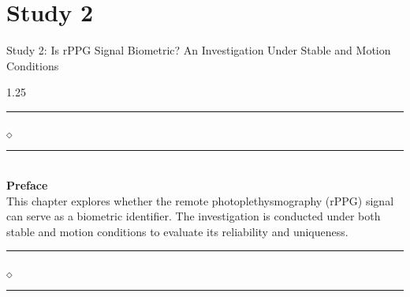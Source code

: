 \chapter[Study 2]{Study 2}{Study 2: Is rPPG Signal Biometric? An Investigation Under Stable and Motion Conditions}\label{Proposed_Work}


\begin{spacing}{1.25}
\vskip 20pt
\noindent
\rule{0.49\textwidth}{0.75pt} $_{\Diamond}$ \rule{0.49\textwidth}{0.75pt}\\
{\Large{\textbf{Preface}}}\\
This chapter explores whether the remote photoplethysmography (rPPG) signal can serve as a biometric identifier. The investigation is conducted under both stable and motion conditions to evaluate its reliability and uniqueness.\\
\rule{0.49\textwidth}{0.75pt} $_{\Diamond}$ \rule{0.49\textwidth}{0.75pt}
\end{spacing}
\newpage









% 



